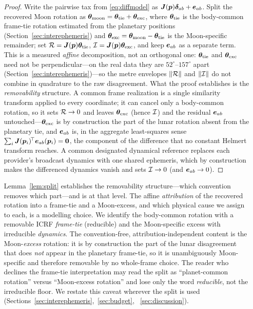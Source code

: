 \begin{proof}
Write the pairwise tax from \eqref{eq:diffmodel} as
$\bm{J}(\bm{p})\bm{\delta}_{ab}+\bm{e}_{ab}$. Split the recovered Moon rotation as
$\bm{\theta}_{\mathrm{moon}}=\bm{\theta}_{\mathrm{tie}}+\bm{\theta}_{\mathrm{exc}}$, where
$\bm{\theta}_{\mathrm{tie}}$ is the body-common frame-tie rotation estimated from the
planetary positions (Section~\ref{sec:interephemeris}) and
$\bm{\theta}_{\mathrm{exc}}=\bm{\theta}_{\mathrm{moon}}-\bm{\theta}_{\mathrm{tie}}$ is the Moon-specific
remainder; set $\mathcal{R}=\bm{J}(\bm{p})\bm{\theta}_{\mathrm{tie}}$,
$\mathcal{I}=\bm{J}(\bm{p})\bm{\theta}_{\mathrm{exc}}$, and keep $\bm{e}_{ab}$ as a separate term.
This is a measured \emph{affine} decomposition, not an orthogonal one:
$\bm{\theta}_{\mathrm{tie}}$ and $\bm{\theta}_{\mathrm{exc}}$ need not be perpendicular---on the real
data they are $52^\circ$--$157^\circ$ apart (Section~\ref{sec:interephemeris})---so
the metre envelopes $\|\mathcal{R}\|$ and $\|\mathcal{I}\|$ do not combine in quadrature to the
raw disagreement. What the proof establishes is the \emph{removability} structure. A
common frame realization is a single similarity transform applied to every
coordinate; it can cancel only a body-common rotation, so it sets $\mathcal{R}\to0$ and
leaves $\bm{\theta}_{\mathrm{exc}}$ (hence $\mathcal{I}$) and the residual $\bm{e}_{ab}$
untouched---$\bm{\theta}_{\mathrm{exc}}$ is by construction the part of the lunar rotation
absent from the planetary tie, and $\bm{e}_{ab}$ is, in the aggregate least-squares
sense $\sum_i\bm{J}(\bm p_i)^{\!\top}\bm{e}_{ab}(\bm p_i)=\bm 0$, the component of the
difference that no constant Helmert transform reaches. A common designated dynamical
reference replaces each provider's broadcast dynamics with one shared ephemeris, which
by construction makes the differenced dynamics vanish and sets $\mathcal{I}\to0$ (and
$\bm{e}_{ab}\to0$).
\end{proof}

\begin{remark}
\label{rem:attribution}
Lemma~\ref{lem:split} establishes the removability structure---which convention
removes which part---and is \Proven{} at that level. The affine \emph{attribution} of
the recovered rotation into a frame-tie and a Moon-excess, and which physical cause we
assign to each, is a modelling choice. We
identify the body-common rotation with a removable ICRF \emph{frame-tie} (reducible)
and the Moon-specific excess with irreducible \emph{dynamics}. The convention-free,
attribution-independent content is the Moon-\emph{excess} rotation: it is by
construction the part of the lunar disagreement that does \emph{not} appear in the
planetary frame-tie, so it is unambiguously Moon-specific and therefore removable by
no whole-frame choice. The reader who declines the frame-tie interpretation may read
the split as ``planet-common rotation'' versus ``Moon-excess rotation'' and lose only
the word \emph{reducible}, not the irreducible floor. We restate this caveat wherever
the split is used (Sections~\ref{sec:interephemeris},~\ref{sec:budget},~%
\ref{sec:discussion}).
\end{remark}

